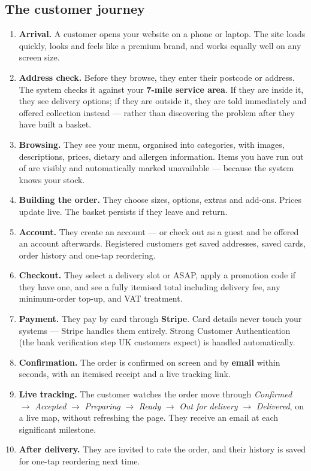 \documentclass[11pt,a4paper]{article}
\begin{document}
\subsection{The customer journey}

\begin{enumerate}[leftmargin=17pt]
\item \textbf{Arrival.} A customer opens your website on a phone or laptop. The site
loads quickly, looks and feels like a premium brand, and works equally well on any
screen size.
\item \textbf{Address check.} Before they browse, they enter their postcode or address.
The system checks it against your \textbf{7-mile service area}. If they are inside it,
they see delivery options; if they are outside it, they are told immediately and offered
collection instead --- rather than discovering the problem after they have built a basket.
\item \textbf{Browsing.} They see your menu, organised into categories, with images,
descriptions, prices, dietary and allergen information. Items you have run out of are
visibly and automatically marked unavailable --- because the system knows your stock.
\item \textbf{Building the order.} They choose sizes, options, extras and add-ons.
Prices update live. The basket persists if they leave and return.
\item \textbf{Account.} They create an account --- or check out as a guest and be offered
an account afterwards. Registered customers get saved addresses, saved cards, order
history and one-tap reordering.
\item \textbf{Checkout.} They select a delivery slot or ASAP, apply a promotion code if
they have one, and see a fully itemised total including delivery fee, any minimum-order
top-up, and VAT treatment.
\item \textbf{Payment.} They pay by card through \textbf{Stripe}. Card details never
touch your systems --- Stripe handles them entirely. Strong Customer Authentication
(the bank verification step UK customers expect) is handled automatically.
\item \textbf{Confirmation.} The order is confirmed on screen and by \textbf{email}
within seconds, with an itemised receipt and a live tracking link.
\item \textbf{Live tracking.} The customer watches the order move through
\emph{Confirmed} $\rightarrow$ \emph{Accepted} $\rightarrow$ \emph{Preparing}
$\rightarrow$ \emph{Ready} $\rightarrow$ \emph{Out for delivery} $\rightarrow$
\emph{Delivered}, on a live map, without refreshing the page. They receive an email at
each significant milestone.
\item \textbf{After delivery.} They are invited to rate the order, and their history is
saved for one-tap reordering next time.
\end{enumerate}
\end{document}
